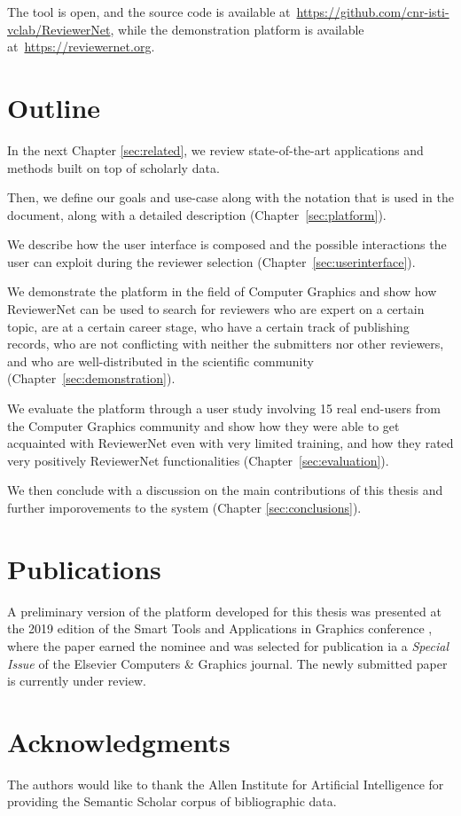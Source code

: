 The tool is open, and the source code is available at~\url{https://github.com/cnr-isti-vclab/ReviewerNet}, while the demonstration platform is available at~\url{https://reviewernet.org}.
\section{Outline}

In the next Chapter \ref{sec:related}, we review state-of-the-art applications and methods built on top of scholarly data.

Then, we define our goals and use-case along with the notation that is used in the document, along with a detailed description  (Chapter~\ref{sec:platform}). 

We describe how the user interface is composed and the possible interactions the user can exploit during the reviewer selection (Chapter~\ref{sec:userinterface}). 

We demonstrate the platform in the field of Computer Graphics and show how ReviewerNet can be used to search for reviewers who are expert on a certain topic, are at a certain career stage, who have a certain track of publishing records, who are not conflicting with neither the submitters nor other reviewers, and who are well-distributed in the scientific community (Chapter~\ref{sec:demonstration}). 

We evaluate the platform through a user study involving 15 real end-users from the Computer Graphics community and show how they were able to get acquainted with ReviewerNet even with very limited training, and how they rated very positively ReviewerNet functionalities (Chapter~\ref{sec:evaluation}).  

We then conclude with a discussion on the main contributions of this thesis and further imporovements to the system (Chapter \ref{sec:conclusions}).

\section{Publications}

A preliminary version of the platform developed for this thesis was presented at the 2019 edition of the Smart Tools and Applications in Graphics conference \cite{stag19}, where the paper earned the  nominee and was selected for publication ia a \emph{Special Issue} of the Elsevier Computers \& Graphics journal. The newly submitted paper is currently under review.

\section*{Acknowledgments}

The authors would like to thank the Allen Institute for Artificial Intelligence for providing the Semantic Scholar corpus of bibliographic data.